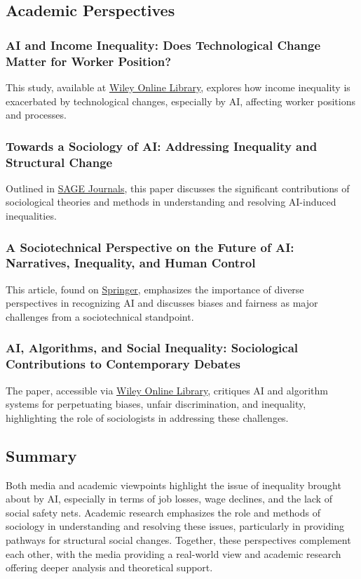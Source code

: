\documentclass[11pt]{article}
\begin{document}
\subsection{Academic Perspectives}

\subsubsection{AI and Income Inequality: Does Technological Change Matter for Worker Position?} 
    This study, available at \href{https://onlinelibrary.wiley.com/doi/full/10.1002/pa.2326}{Wiley Online Library}, explores how income inequality is exacerbated by technological changes, especially by AI, affecting worker positions and processes.
    
\subsubsection{Towards a Sociology of AI: Addressing Inequality and Structural Change}
    Outlined in \href{https://journals.sagepub.com/doi/full/10.1177/2378023121999581}{SAGE Journals}, this paper discusses the significant contributions of sociological theories and methods in understanding and resolving AI-induced inequalities.
    
\subsubsection{A Sociotechnical Perspective on the Future of AI: Narratives, Inequality, and Human Control} 
    This article, found on \href{https://link.springer.com/article/10.1007/s10676-022-09624-3}{Springer}, emphasizes the importance of diverse perspectives in recognizing AI and discusses biases and fairness as major challenges from a sociotechnical standpoint.
    
\subsubsection{AI, Algorithms, and Social Inequality: Sociological Contributions to Contemporary Debates} 
    The paper, accessible via \href{https://compass.onlinelibrary.wiley.com/doi/full/10.1111/soc4.12962}{Wiley Online Library}, critiques AI and algorithm systems for perpetuating biases, unfair discrimination, and inequality, highlighting the role of sociologists in addressing these challenges.

\subsection*{Summary}

Both media and academic viewpoints highlight the issue of inequality brought about by AI, especially in terms of job losses, wage declines, and the lack of social safety nets. Academic research emphasizes the role and methods of sociology in understanding and resolving these issues, particularly in providing pathways for structural social changes. Together, these perspectives complement each other, with the media providing a real-world view and academic research offering deeper analysis and theoretical support.
\end{document}
